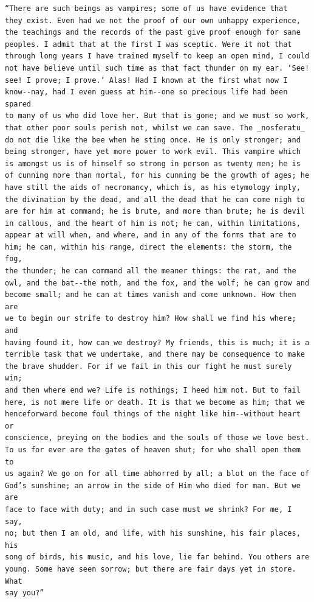 \documentclass{article}
\begin{document}
\begin{verbatim}
“There are such beings as vampires; some of us have evidence that
they exist. Even had we not the proof of our own unhappy experience,
the teachings and the records of the past give proof enough for sane
peoples. I admit that at the first I was sceptic. Were it not that
through long years I have trained myself to keep an open mind, I could
not have believe until such time as that fact thunder on my ear. ‘See!
see! I prove; I prove.’ Alas! Had I known at the first what now I
know--nay, had I even guess at him--one so precious life had been spared
to many of us who did love her. But that is gone; and we must so work,
that other poor souls perish not, whilst we can save. The _nosferatu_
do not die like the bee when he sting once. He is only stronger; and
being stronger, have yet more power to work evil. This vampire which
is amongst us is of himself so strong in person as twenty men; he is
of cunning more than mortal, for his cunning be the growth of ages; he
have still the aids of necromancy, which is, as his etymology imply,
the divination by the dead, and all the dead that he can come nigh to
are for him at command; he is brute, and more than brute; he is devil
in callous, and the heart of him is not; he can, within limitations,
appear at will when, and where, and in any of the forms that are to
him; he can, within his range, direct the elements: the storm, the fog,
the thunder; he can command all the meaner things: the rat, and the
owl, and the bat--the moth, and the fox, and the wolf; he can grow and
become small; and he can at times vanish and come unknown. How then are
we to begin our strife to destroy him? How shall we find his where; and
having found it, how can we destroy? My friends, this is much; it is a
terrible task that we undertake, and there may be consequence to make
the brave shudder. For if we fail in this our fight he must surely win;
and then where end we? Life is nothings; I heed him not. But to fail
here, is not mere life or death. It is that we become as him; that we
henceforward become foul things of the night like him--without heart or
conscience, preying on the bodies and the souls of those we love best.
To us for ever are the gates of heaven shut; for who shall open them to
us again? We go on for all time abhorred by all; a blot on the face of
God’s sunshine; an arrow in the side of Him who died for man. But we are
face to face with duty; and in such case must we shrink? For me, I say,
no; but then I am old, and life, with his sunshine, his fair places, his
song of birds, his music, and his love, lie far behind. You others are
young. Some have seen sorrow; but there are fair days yet in store. What
say you?”


\end{verbatim}
\end{document}
